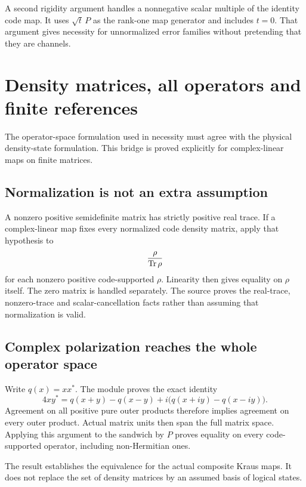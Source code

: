A second rigidity argument handles a nonnegative scalar multiple of the identity code map. It uses $\sqrt t\,P$ as the rank-one map generator and includes $t=0$. That argument gives necessity for unnormalized error families without pretending that they are channels.



\section{Density matrices, all operators and finite references}\label{supp5:section:004}
The operator-space formulation used in necessity must agree with the physical density-state formulation. This bridge is proved explicitly for complex-linear maps on finite matrices.

\subsection{Normalization is not an extra assumption}
A nonzero positive semidefinite matrix has strictly positive real trace. If a complex-linear map fixes every normalized code density matrix, apply that hypothesis to
\[
\frac{\rho}{\operatorname{Tr}\rho}
\]
for each nonzero positive code-supported $\rho$. Linearity then gives equality on $\rho$ itself. The zero matrix is handled separately. The source proves the real-trace, nonzero-trace and scalar-cancellation facts rather than assuming that normalization is valid.

\subsection{Complex polarization reaches the whole operator space}
Write $q(x)=xx^*$. The module proves the exact identity
\[
4xy^*=q(x+y)-q(x-y)
+i\bigl(q(x+iy)-q(x-iy)\bigr).
\]
Agreement on all positive pure outer products therefore implies agreement on every outer product. Actual matrix units then span the full matrix space. Applying this argument to the sandwich by $P$ proves equality on every code-supported operator, including non-Hermitian ones.

The result  establishes the equivalence for the actual composite Kraus maps. It does not replace the set of density matrices by an assumed basis of logical states.

